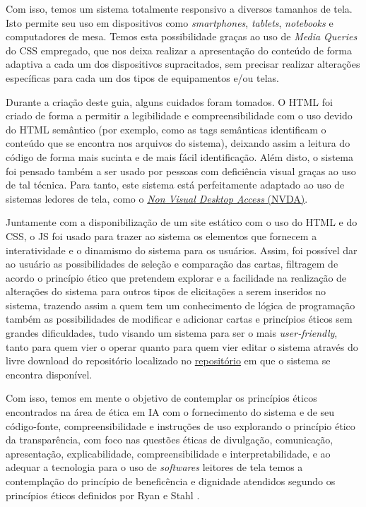 Com isso, temos um sistema totalmente responsivo a diversos tamanhos de tela. Isto permite seu uso em dispositivos como \textit{smartphones}, \textit{tablets}, \textit{notebooks} e computadores de mesa. Temos esta possibilidade graças ao uso de \textit{Media Queries} do CSS empregado, que nos deixa realizar a apresentação do conteúdo de forma adaptiva a cada um dos dispositivos supracitados, sem precisar realizar alterações específicas para cada um dos tipos de equipamentos e/ou telas.

Durante a criação deste guia, alguns cuidados foram tomados. O \acrshort{HTML} foi criado de forma a permitir a legibilidade e compreensibilidade com o uso devido do \acrshort{HTML} semântico (por exemplo, como as tags semânticas identificam o conteúdo que se encontra nos arquivos do sistema), deixando assim a leitura do código de forma mais sucinta e de mais fácil identificação. Além disto, o sistema foi pensado também a ser usado por pessoas com deficiência visual graças ao uso de tal técnica. Para tanto, este sistema está perfeitamente adaptado ao uso de sistemas ledores de tela, como o \href{https://www.nvaccess.org/}{\textit{Non Visual Desktop Access} (NVDA)}.

Juntamente com a disponibilização de um site estático com o uso do \acrshort{HTML} e do \acrshort{CSS}, o \acrshort{JS} foi usado para trazer ao sistema os elementos que fornecem a interatividade e o dinamismo do sistema para os usuários. Assim, foi possível dar ao usuário as possibilidades de seleção e comparação das cartas, filtragem de acordo o princípio ético que pretendem explorar e a facilidade na realização de alterações do sistema para outros tipos de elicitações a serem inseridos no sistema, trazendo assim a quem tem um conhecimento de lógica de programação também as possibilidades de modificar e adicionar cartas e princípios éticos sem grandes dificuldades, tudo visando um sistema para ser o mais \textit{user-friendly}, tanto para quem vier o operar quanto para quem vier editar o sistema através do livre download do repositório localizado no  \href{https://www.github.com/oggvaldo/eccola}{repositório} em que o sistema se encontra disponível.

Com isso, temos em mente o objetivo de contemplar os princípios éticos encontrados na área de ética em IA com o fornecimento do sistema e de seu código-fonte, compreensibilidade e instruções de uso explorando o princípio ético da transparência, com foco nas questões éticas de divulgação, comunicação, apresentação, explicabilidade, compreensibilidade e interpretabilidade, e ao adequar a tecnologia para o uso de \textit{softwares} leitores de tela temos a contemplação do princípio de beneficência e dignidade atendidos segundo os princípios éticos definidos por Ryan e Stahl \cite{Ryan2020ArtificialIE}.

